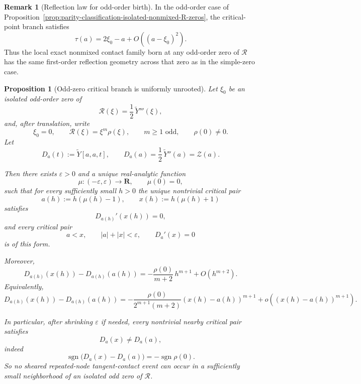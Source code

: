 \documentclass[11pt,a4paper]{amsart}
\theoremstyle{plain}
\newtheorem{proposition}[theorem]{Proposition}
\theoremstyle{definition}
\newtheorem{remark}[theorem]{Remark}
\begin{document}
\begin{remark}[Reflection law for odd-order birth]
\label{rem:reflection-law-odd-order-R-zero}
In the odd-order case of
Proposition~\ref{prop:parity-classification-isolated-nonmixed-R-zeros},
the critical-point branch satisfies
\[
\tau(a)=2\xi_0-a+O((a-\xi_0)^2).
\]
Thus the local exact nonmixed contact family born at any odd-order zero of
$\mathcal R$ has the same first-order reflection geometry across that zero as
in the simple-zero case.
\end{remark}

\begin{proposition}[Odd-zero critical branch is uniformly unrooted]
\label{prop:odd-zero-critical-branch-uniformly-unrooted}
Let $\xi_0$ be an isolated odd-order zero of
\[
\mathcal R(\xi)=\frac12\,\widetilde Y'''(\xi),
\]
and, after translation, write
\[
\xi_0=0,
\qquad
\mathcal R(\xi)=\xi^m\rho(\xi),
\qquad
m\ge 1 \text{ odd},
\qquad
\rho(0)\neq 0.
\]
Let
\[
D_a(t):=\widetilde Y[a,a,t],
\qquad
D_a(a)=\frac12\,\widetilde Y''(a)=\mathcal Z(a).
\]

Then there exists $\varepsilon>0$ and a unique real-analytic function
\[
\mu:(-\varepsilon,\varepsilon)\to\mathbf R,
\qquad
\mu(0)=0,
\]
such that for every sufficiently small $h>0$ the unique nontrivial critical pair
\[
a(h):=h(\mu(h)-1),
\qquad
x(h):=h(\mu(h)+1)
\]
satisfies
\[
D_{a(h)}'(x(h))=0,
\]
and every critical pair
\[
a<x,\qquad |a|+|x|<\varepsilon,\qquad D_a'(x)=0
\]
is of this form.

Moreover,
\[
D_{a(h)}(x(h))-D_{a(h)}(a(h))
=
-\frac{\rho(0)}{m+2}\,h^{m+1}+O(h^{m+2}).
\]
Equivalently,
\[
D_{a(h)}(x(h))-D_{a(h)}(a(h))
=
-\frac{\rho(0)}{2^{m+1}(m+2)}(x(h)-a(h))^{m+1}
+o\!\left((x(h)-a(h))^{m+1}\right).
\]

In particular, after shrinking $\varepsilon$ if needed, every nontrivial nearby
critical pair satisfies
\[
D_a(x)\neq D_a(a),
\]
indeed
\[
\operatorname{sgn}\bigl(D_a(x)-D_a(a)\bigr)=-\operatorname{sgn}\rho(0).
\]
So no sheared repeated-node tangent-contact event can occur in a sufficiently
small neighborhood of an isolated odd zero of $\mathcal R$.
\end{proposition}
\end{document}

